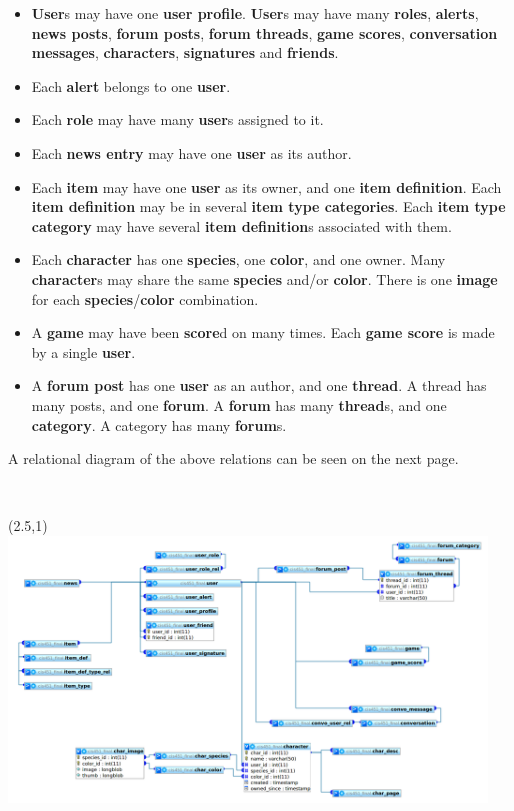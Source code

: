 \documentclass{book}
\begin{document}
\begin{itemize}
	\item {\bf User}s may have one {\bf user profile}.
	{\bf User}s may have many
	{\bf roles},
	{\bf alerts},
	{\bf news posts},
	{\bf forum posts},
	{\bf forum threads},
	{\bf game scores},
	{\bf conversation messages},
	{\bf characters},
	{\bf signatures} and
	{\bf friends}.
		
	\item Each {\bf alert} belongs to one {\bf user}.
		
	\item Each {\bf role} may have many {\bf user}s assigned to it.

	\item Each {\bf news entry} may have one {\bf user} as its author.

	\item Each {\bf item} may have one {\bf user} as its owner, and one {\bf item definition}.  Each {\bf item definition} may be in several {\bf item type categories}.  Each {\bf item type category} may have several {\bf item definition}s associated with them.

	\item Each {\bf character} has one {\bf species}, one {\bf color}, and one owner.  Many {\bf character}s may share the same {\bf species} and/or {\bf color}.  There is one {\bf image} for each {\bf species}/{\bf color} combination.

	\item A {\bf game} may have been {\bf score}d on many times.  Each {\bf game score} is made by a single {\bf user}.

	\item A {\bf forum post} has one {\bf user} as an author, and one {\bf thread}.  A thread has many posts, and one {\bf forum}.  A {\bf forum} has many {\bf thread}s, and one {\bf category}.  A category has many {\bf forum}s.
\end{itemize}

A relational diagram of the above relations can be seen on the next page.

\newpage
\hspace{\textwidth}\\
\begin{textblock}{0}(2.5,1) 
	\includegraphics[angle=90,width=5in]{diagram.png}
\end{textblock}
\newpage
\end{document}
